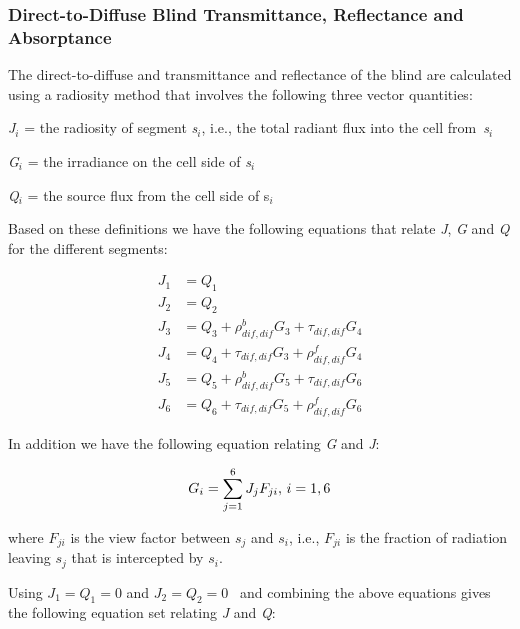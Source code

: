 \subsubsection{Direct-to-Diffuse Blind Transmittance, Reflectance and Absorptance}\label{direct-to-diffuse-blind-transmittance-reflectance-and-absorptance}

The direct-to-diffuse and transmittance and reflectance of the blind are calculated using a radiosity method that involves the following three vector quantities:

\emph{J\(_{i}\)} = the radiosity of segment \emph{s\(_{i}\)}, i.e., the total radiant flux into the cell from~\emph{s\(_{i}\)}

\emph{G\(_{i}\)} = the irradiance on the cell side of \emph{s\(_{i}\)}

\emph{Q\(_{i}\)} = the source flux from the cell side of s\emph{\(_{i}\)}

Based on these definitions we have the following equations that relate \emph{J}, \emph{G} and \emph{Q} for the different segments:

\begin{equation}
  \begin{array}{rl}
    J_1 & = Q_1 \\
    J_2 & = Q_2 \\
    J_3 & = Q_3 + \rho_{dif,dif}^b G_3 + \tau_{dif,dif} G_4 \\
    J_4 & = Q_4 + \tau_{dif,dif} G_3 + \rho_{dif,dif}^f G_4 \\
    J_5 & = Q_5 + \rho_{dif,dif}^b G_5 + \tau_{dif,dif} G_6 \\
    J_6 & = Q_6 + \tau_{dif,dif} G_5 + \rho_{dif,dif}^f G_6
  \end{array}
\end{equation}

In addition we have the following equation relating \emph{G} and \emph{J}:

\begin{equation}
{G_i} = \sum\limits_{j = 1}^6 {{J_j}{F_{ji}}{\rm{ ,    }}~i = 1,6}
\end{equation}

where \({F_{ji}}\) is the view factor between \({s_j}\) and \({s_i}\), i.e., \({F_{ji}}\) is the fraction of radiation leaving \({s_j}\) that is intercepted by \({s_i}\).

Using \({J_1} = {Q_1} = 0\) and \({J_2} = {Q_2} = 0\) ~and combining the above equations gives the following equation set relating \emph{J} and \emph{Q}:

